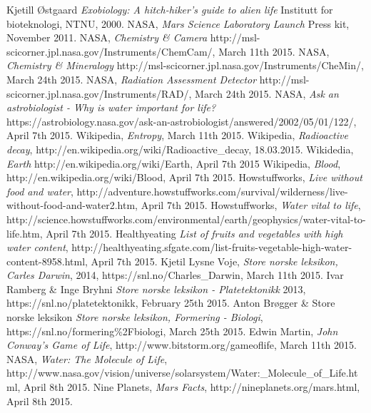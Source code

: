 \begin{thebibliography}{99}	%
		Kjetill Østgaard
		\emph{Exobiology: A hitch-hiker's guide to alien life}
		Institutt for bioteknologi,
		NTNU,
		2000.
		NASA,
		\emph{Mars Science Laboratory Launch}
		Press kit,
		November 2011.
		NASA,
		\emph{Chemistry \& Camera}
		http://msl-scicorner.jpl.nasa.gov/Instruments/ChemCam/,
		March 11th 2015.
		NASA,
		\emph{Chemistry \& Mineralogy}
		http://msl-scicorner.jpl.nasa.gov/Instruments/CheMin/,
		March 24th 2015.
		NASA,
		\emph{Radiation Assessment Detector}
		http://msl-scicorner.jpl.nasa.gov/Instruments/RAD/,
		March 24th 2015.
		NASA,
		\emph{Ask an astrobiologist - Why is water important for life?}
		https://astrobiology.nasa.gov/ask-an-astrobiologist/answered/2002/05/01/122/,
		April 7th 2015.
		Wikipedia,
		\emph{Entropy},
		March 11th 2015.
		Wikipedia,
		\emph{Radioactive decay},
		http://en.wikipedia.org/wiki/Radioactive\_decay,
		18.03.2015.
		Wikidedia,
		\emph{Earth}
		http://en.wikipedia.org/wiki/Earth,
		April 7th 2015
		Wikipedia,
		\emph{Blood},
		http://en.wikipedia.org/wiki/Blood,
		April 7th 2015.
		Howstuffworks,
		\emph{Live without food and water},
		http://adventure.howstuffworks.com/survival/wilderness/live-without-food-and-water2.htm,
		April 7th 2015.
		Howstuffworks,
		\emph{Water vital to life},
		http://science.howstuffworks.com/environmental/earth/geophysics/water-vital-to-life.htm,
		April 7th 2015.
		Healthyeating
		\emph{List of fruits and vegetables with high water content},
		http://healthyeating.sfgate.com/list-fruits-vegetable-high-water-content-8958.html,
		April 7th 2015.
		Kjetil Lysne Voje,
		\emph{Store norske leksikon, Carles Darwin},
		2014,
		https://snl.no/Charles\_Darwin,
		March 11th 2015.
		Ivar Ramberg \& Inge Bryhni
		\emph{Store norske leksikon - Platetektonikk}
		2013,
		https://snl.no/platetektonikk,
		February 25th 2015.
		Anton Brøgger \& Store norske leksikon
		\emph{Store norske leksikon, Formering - Biologi},
		https://snl.no/formering\%2Fbiologi,
		March 25th 2015.
		Edwin Martin,
		\emph{John Conway's Game of Life},
		http://www.bitstorm.org/gameoflife,
		March 11th 2015.
		NASA,
		\emph{Water: The Molecule of Life},
		http://www.nasa.gov/vision/universe/solarsystem/Water:_Molecule_of_Life.html,
		April 8th 2015.
		Nine Planets,
		\emph{Mars Facts},
		http://nineplanets.org/mars.html,
		April 8th 2015.
\end{thebibliography}